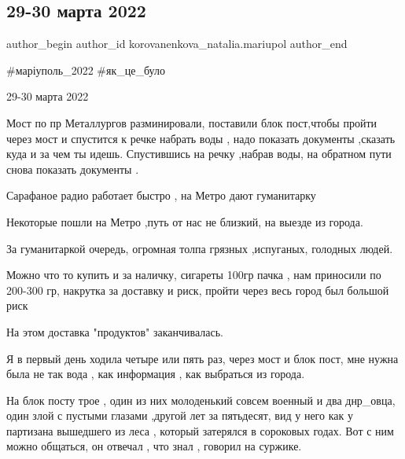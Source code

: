  
 
 
 
 

\subsection{29-30 марта 2022}
\label{sec:31_03_2023.fb.korovanenkova_natalia.mariupol.1.29_30_marta_2022}

\ifcmt
 author_begin
   author_id korovanenkova_natalia.mariupol
 author_end
\fi

\#маріуполь\_2022 \#як\_це\_було

29-30 марта 2022

Мост по пр Металлургов разминировали, поставили блок пост,чтобы пройти  через
мост и спустится к речке набрать воды , надо показать документы ,сказать куда и
за чем ты идешь. Спустившись на речку ,набрав воды, на обратном пути снова
показать документы .

Сарафаное радио работает быстро , на Метро дают гуманитарку 

Некоторые пошли на Метро ,путь от нас не близкий, на выезде из города.

За гуманитаркой  очередь, огромная толпа грязных ,испуганых, голодных людей.

Можно что то купить  и за наличку,  сигареты 100гр пачка , нам приносили по
200-300 гр, накрутка за доставку и риск, пройти через весь город был большой
риск

На этом доставка "продуктов" заканчивалась.

Я в первый день ходила четыре или пять раз, через мост и блок пост, мне нужна
была не так вода , как информация , как выбраться из города. 

На блок посту трое  , один из них молоденький совсем  военный и два  днр\_овца,
один злой с пустыми глазами ,другой лет за пятьдесят, вид у него как у
партизана вышедшего из леса , который затерялся в сороковых годах. Вот с ним
можно общаться, он отвечал , что знал  , говорил на суржике.

